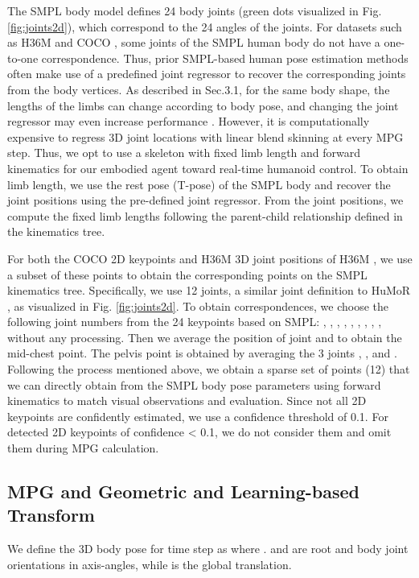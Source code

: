 The SMPL body model defines 24 body joints (green dots visualized in Fig. \ref{fig:joints2d}), which correspond to the 24 angles of the joints. For datasets such as H36M \cite{h36m_pami} and COCO \cite{Lin2014MicrosoftCC}, some joints of the SMPL human body do not have a one-to-one correspondence. Thus, prior SMPL-based human pose estimation methods often make use of a predefined joint regressor to recover the corresponding joints from the body vertices. As described in Sec.3.1, for the same body shape, the lengths of the limbs can change according to body pose, and changing the joint regressor may even increase performance \cite{Hedlin2022ASM}. However, it is computationally expensive to regress 3D joint locations with linear blend skinning at every MPG step. Thus, we opt to use a skeleton with fixed limb length and forward kinematics for our embodied agent toward real-time humanoid control.
To obtain limb length, we use the rest pose (T-pose) of the SMPL body and recover the joint positions using the pre-defined joint regressor. From the joint positions, we compute the fixed limb lengths following the parent-child relationship defined in the kinematics tree. 
 
For both the COCO 2D keypoints \cite{Lin2014MicrosoftCC} and H36M 3D joint positions of H36M \cite{h36m_pami}, we use a subset of these points to obtain the corresponding points on the SMPL kinematics tree. Specifically, we use 12 joints, a similar joint definition to HuMoR \cite{rempe2021humor}, as visualized in Fig. \ref{fig:joints2d}. To obtain correspondences, we choose the following joint numbers from the 24 keypoints based on SMPL: , , , , , , , , ,  without any processing. Then we average the position of joint  and  to obtain the mid-chest point. The pelvis point is obtained by averaging the 3 joints , , and . Following the process mentioned above, we obtain a sparse set of points (12) that we can directly obtain from the SMPL body pose parameters using forward kinematics to match visual observations and evaluation. Since not all 2D keypoints are confidently estimated, we use a confidence threshold of 0.1. For detected 2D keypoints of confidence < 0.1, we do not consider them and omit them during MPG calculation. 



\subsection{MPG and Geometric and Learning-based Transform }
We define the 3D body pose for time step  as  where .  and  are root and body joint orientations in axis-angles, while  is the global translation. 

